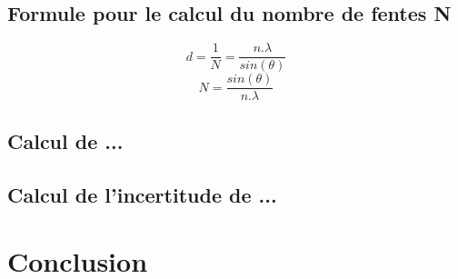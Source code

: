 \documentclass[11pt,a4paper]{report}
\begin{document}
	\subsection{Formule pour le calcul du nombre de fentes N}
	\begin{equation}
	d = \frac{1}{N} = \frac{n.\lambda}{sin(\theta)}
	\end{equation}
	\begin{equation}
	N =  \frac{sin(\theta)}{n.\lambda}
	\end{equation}
	\subsection{Calcul de ...}
	\subsection{Calcul de l'incertitude de ...}
	\section{Conclusion}
\end{document}
